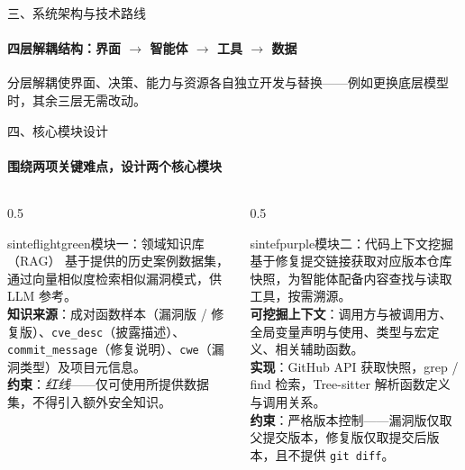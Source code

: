 \documentclass{beamer}
\begin{document}
\begin{frame}{三、系统架构与技术路线}
\framesubtitle{四层解耦结构：界面 $\rightarrow$ 智能体 $\rightarrow$ 工具 $\rightarrow$ 数据}
\centering
{}
\vspace{0.4em}

{\footnotesize 分层解耦使界面、决策、能力与资源各自独立开发与替换——例如更换底层模型时，其余三层无需改动。}
\end{frame}

\begin{frame}{四、核心模块设计}
\framesubtitle{围绕两项关键难点，设计两个核心模块}
\footnotesize
\begin{columns}[t]
\begin{column}{0.5\textwidth}
\begin{colorblock}[black]{sinteflightgreen}{模块一：领域知识库（RAG）}
基于提供的历史案例数据集，通过向量相似度检索相似漏洞模式，供 LLM 参考。\\
\textbf{知识来源}：成对函数样本（漏洞版 / 修复版）、\texttt{cve\_desc}（披露描述）、
\texttt{commit\_message}（修复说明）、\texttt{cwe}（漏洞类型）及项目元信息。\\
\textbf{约束}：\emph{红线}——仅可使用所提供数据集，不得引入额外安全知识。
\end{colorblock}
\end{column}
\begin{column}{0.5\textwidth}
\begin{colorblock}[white]{sintefpurple}{模块二：代码上下文挖掘}
基于修复提交链接获取对应版本仓库快照，为智能体配备内容查找与读取工具，按需溯源。\\
\textbf{可挖掘上下文}：调用方与被调用方、全局变量声明与使用、类型与宏定义、相关辅助函数。\\
\textbf{实现}：GitHub API 获取快照，grep / find 检索，Tree-sitter 解析函数定义与调用关系。\\
\textbf{约束}：严格版本控制——漏洞版仅取父提交版本，修复版仅取提交后版本，且不提供 \texttt{git diff}。
\end{colorblock}
\end{column}
\end{columns}
\end{frame}
\end{document}
